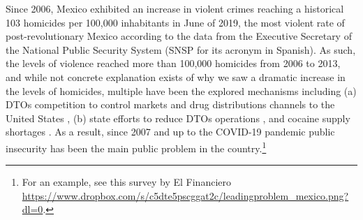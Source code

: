 Since 2006, Mexico exhibited an increase in violent crimes reaching a historical 103 homicides per 100,000 inhabitants in June of 2019, the most violent rate of post-revolutionary Mexico according to the data from the Executive Secretary of the National Public Security System (SNSP for its acronym in Spanish). As such, the levels of violence reached more than 100,000 homicides from 2006 to 2013, and while not concrete explanation exists of why we saw a dramatic increase in the levels of homicides, multiple have been the explored mechanisms including (a) DTOs competition to control markets and drug distributions channels to the United States \citep{rios_2013, dell_2015}, (b) state efforts to reduce DTOs operations \citep{rios_2013}, and cocaine supply shortages \citep{castillo_etal_2018}. As a result, since 2007 and up to the COVID-19 pandemic public insecurity has been the main public problem in the country.\footnote{For an example, see this survey by El Financiero \url{https://www.dropbox.com/s/c5dte5pscggat2c/leadingproblem_mexico.png?dl=0}.} 

